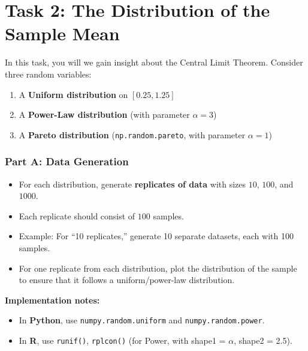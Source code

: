\documentclass[11pt]{article}
\begin{document}
\newpage
\section*{Task 2: The Distribution of the Sample Mean}

In this task, you will we gain insight about the Central Limit Theorem. Consider three random variables:

\begin{enumerate}
    \item[(a)] A \textbf{Uniform distribution} on $[0.25,1.25]$
    \item[(b)] A \textbf{Power-Law distribution} (with parameter $\alpha = 3$)
    \item[(c)] A \textbf{Pareto distribution} (\texttt{np.random.pareto}, with parameter $\alpha = 1$)
\end{enumerate}

\subsubsection*{Part A: Data Generation}
\begin{itemize}
    \item For each distribution, generate \textbf{replicates of data} with sizes $10$, $100$, and $1000$.  
    \item Each replicate should consist of $100$ samples.  
    \item Example: For ``10 replicates,'' generate 10 separate datasets, each with 100 samples.  
    \item For one replicate from each distribution, plot the distribution of the sample to ensure that it follows a uniform/power-law distribution.
\end{itemize}

\textbf{Implementation notes:}  
\begin{itemize}
    \item In \textbf{Python}, use \texttt{numpy.random.uniform} and \texttt{numpy.random.power}.%
    \item In \textbf{R}, use \texttt{runif()}, \texttt{rplcon()} (for Power, with shape1 = $\alpha$, shape2 = 2.5). 
        
\end{itemize}
\end{document}
